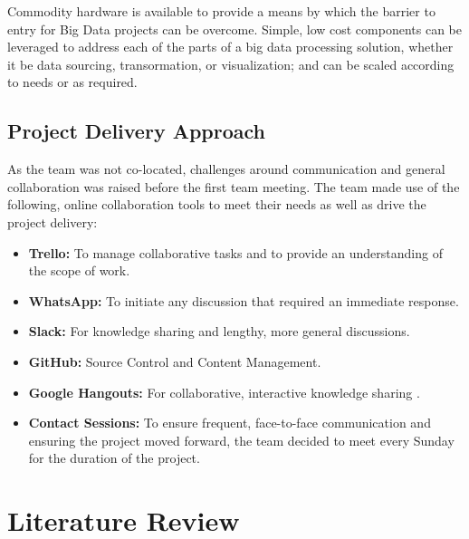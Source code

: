 \documentclass[12pt]{article} %
\begin{document}
Commodity hardware is available to provide a means by which the barrier to entry for Big Data projects can be overcome. Simple, low cost components can be leveraged to address each of the parts of a big data processing solution, whether it be data sourcing, transormation, or visualization; and can be scaled according to needs or as required.

\subsection{Project Delivery Approach}

As the team was not co-located, challenges around communication and general collaboration was raised before the first team meeting. 
The team made use of the following, online collaboration tools to meet their needs as well as drive the project delivery:
\begin{itemize}
	\item \textbf{Trello:} To manage collaborative tasks and to provide an understanding of the scope of work.
	\item \textbf{WhatsApp:} To initiate any discussion that required an immediate response.
	\item \textbf{Slack:} For knowledge sharing and lengthy, more general discussions.
	\item \textbf{GitHub:} Source Control and Content Management.
	\item \textbf{Google Hangouts:} For collaborative, interactive knowledge sharing .
	\item \textbf{Contact Sessions:} To ensure frequent, face-to-face communication and ensuring the project moved forward, the team decided to meet every Sunday for the duration of the project. 
\end{itemize}

	
		
		
	\section{Literature Review}
	
\end{document}
